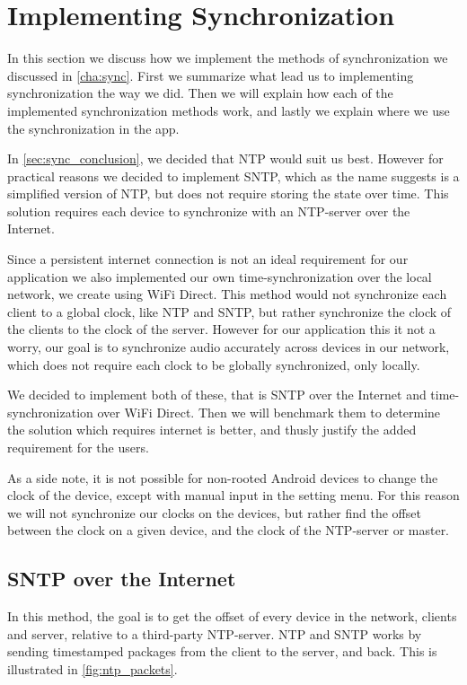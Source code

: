 \section{Implementing Synchronization}\label{sec:impl_sync}
In this section we discuss how we implement the methods of synchronization we discussed in \cref{cha:sync}.
First we summarize what lead us to implementing synchronization the way we did.
Then we will explain how each of the implemented synchronization methods work, and lastly we explain where we use the synchronization in the app.

In \cref{sec:sync_conclusion}, we decided that NTP would suit us best.
However for practical reasons we decided to implement \ac{SNTP}, which as the name suggests is a simplified version of \ac{NTP}, but does not require storing the state over time.
This solution requires each device to synchronize with an \ac{NTP}-server over the Internet.

Since a persistent internet connection is not an ideal requirement for our application we also implemented our own time-synchronization over the local network, we create using WiFi Direct.
This method would not synchronize each client to a global clock, like \ac{NTP} and \ac{SNTP}, but rather synchronize the clock of the clients to the clock of the server.
However for our application this it not a worry, our goal is to synchronize audio accurately across devices in our network, which does not require each clock to be globally synchronized, only locally.

We decided to implement both of these, that is \ac{SNTP} over the Internet and time-synchronization over WiFi Direct.
Then we will benchmark them to determine the solution which requires internet is better, and thusly justify the added requirement for the users.

As a side note, it is not possible for non-rooted Android devices to change the clock of the device, except with manual input in the setting menu.
For this reason we will not synchronize our clocks on the devices, but rather find the offset between the clock on a given device, and the clock of the \ac{NTP}-server or master.

\subsection{\ac{SNTP} over the Internet}
In this method, the goal is to get the offset of every device in the network, clients and server, relative to a third-party \ac{NTP}-server.
\ac{NTP} and \ac{SNTP} works by sending timestamped packages from the client to the server, and back.
This is illustrated in \cref{fig:ntp_packets}.

